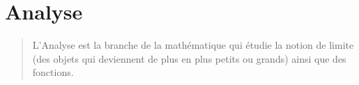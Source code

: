 \part{Analyse}

\vspace{5em}

\begin{quote}
    L'Analyse est la branche de la mathématique qui étudie la notion de limite (des objets qui deviennent de plus en plus petits ou grands) ainsi que des fonctions.
\end{quote}


